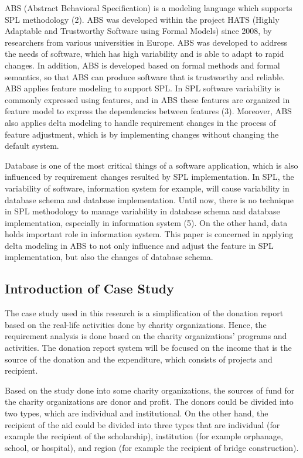 \documentclass[runningheads,a4paper]{llncs}
\begin{document}
ABS (Abstract Behavioral Specification) is a modeling language which supports SPL methodology (2). ABS was developed within the project HATS (Highly Adaptable and Trustworthy Software using Formal Models) since 2008, by researchers from various universities in Europe. ABS was developed to address the needs of software, which has high variability and is able to adapt to rapid changes. In addition, ABS is developed based on formal methods and formal semantics, so that ABS can produce software that is trustworthy and reliable. ABS applies feature modeling to support SPL. In SPL software variability is commonly expressed using features, and in ABS these features are organized in feature model to express the dependencies between features (3). Moreover, ABS also applies delta modeling to handle requirement changes in the process of feature adjustment, which is by implementing changes without changing the default system.

Database is one of the most critical things of a software application, which is also influenced by requirement changes resulted by SPL implementation. In SPL, the variability of software, information system for example, will cause variability in database schema and database implementation. Until now, there is no technique in SPL methodology to manage variability in database schema and database implementation, especially in information system (5). On the other hand, data holds important role in information system. This paper is concerned in applying delta modeling in ABS to not only influence and adjust the feature in SPL implementation, but also the changes of database schema.

\subsection{Introduction of Case Study}

The case study used in this research is a simplification of the donation report based on the real-life activities done by charity organizations. Hence, the requirement analysis is done based on the charity organizations’ programs and activities. The donation report system will be focused on the income that is the source of the donation and the expenditure, which consists of projects and recipient.

Based on the study done into some charity organizations, the sources of fund for the charity organizations are donor and profit. The donors could be divided into two types, which are individual and institutional. On the other hand, the recipient of the aid could be divided into three types that are individual (for example the recipient of the scholarship), institution (for example orphanage, school, or hospital), and region (for example the recipient of bridge construction).
\end{document}
